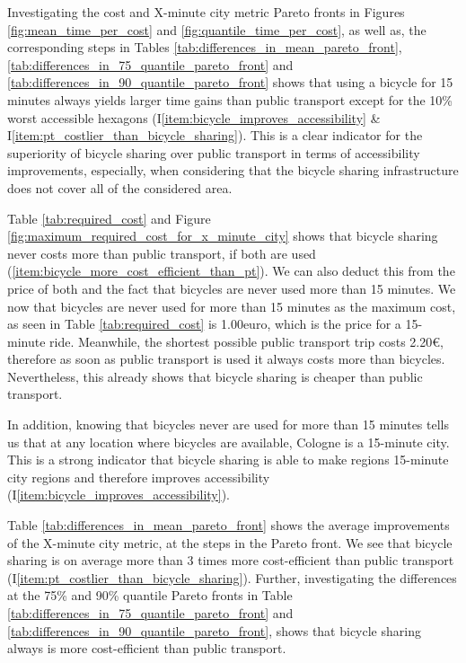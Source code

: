 Investigating the cost and X-minute city metric Pareto fronts in Figures \ref{fig:mean_time_per_cost} and \ref{fig:quantile_time_per_cost}, as well as, the corresponding steps in Tables \ref{tab:differences_in_mean_pareto_front}, \ref{tab:differences_in_75_quantile_pareto_front} and \ref{tab:differences_in_90_quantile_pareto_front} shows that using a bicycle for 15 minutes always yields larger time gains than public transport except for the 10\% worst accessible hexagons (I\ref{item:bicycle_improves_accessibility} \& I\ref{item:pt_costlier_than_bicycle_sharing}).
This is a clear indicator for the superiority of bicycle sharing over public transport in terms of accessibility improvements, especially, when considering that the bicycle sharing infrastructure does not cover all of the considered area.

Table \ref{tab:required_cost} and Figure \ref{fig:maximum_required_cost_for_x_minute_city} shows that bicycle sharing never costs more than public transport, if both are used (\ref{item:bicycle_more_cost_efficient_than_pt}).
We can also deduct this from the price of both and the fact that bicycles are never used more than 15 minutes.
We now that bicycles are never used for more than 15 minutes as the maximum cost, as seen in Table \ref{tab:required_cost} is 1.00euro, which is the price for a 15-minute ride.
Meanwhile, the shortest possible public transport trip costs 2.20\euro, therefore as soon as public transport is used it always costs more than bicycles.
Nevertheless, this already shows that bicycle sharing is cheaper than public transport. 

In addition, knowing that bicycles never are used for more than 15 minutes tells us that at any location where bicycles are available, Cologne is a 15-minute city.
This is a strong indicator that bicycle sharing is able to make regions 15-minute city regions and therefore improves accessibility (I\ref{item:bicycle_improves_accessibility}).

Table \ref{tab:differences_in_mean_pareto_front} shows the average improvements of the X-minute city metric, at the steps in the Pareto front.
We see that bicycle sharing is on average more than 3 times more cost-efficient than public transport (I\ref{item:pt_costlier_than_bicycle_sharing}).
Further, investigating the differences at the 75\% and 90\% quantile Pareto fronts in Table \ref{tab:differences_in_75_quantile_pareto_front} and \ref{tab:differences_in_90_quantile_pareto_front}, shows that bicycle sharing always is more cost-efficient than public transport.


